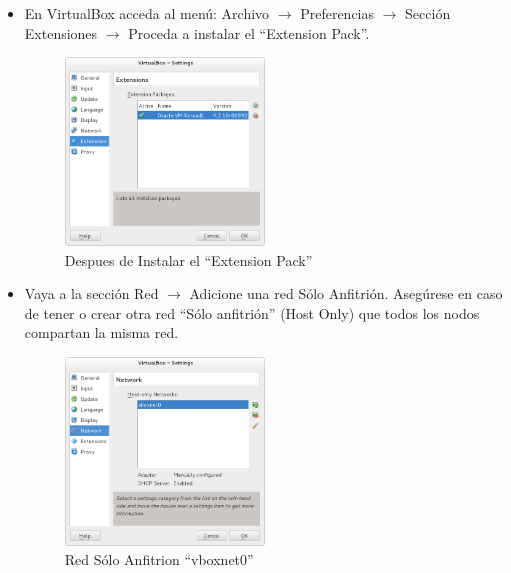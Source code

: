 \begin{enumerate}
\begin{itemize}


	\item En VirtualBox acceda al menú: Archivo $\rightarrow$ Preferencias $\rightarrow$ Sección Extensiones $\rightarrow$ Proceda a instalar el ``Extension Pack''. 
	
	\begin{figure}[H]
		\centering
		\includegraphics[width=0.5\textwidth]{aux/conextensionpack}
		\caption{Despues de Instalar el ``Extension Pack''}
	\end{figure}
	

	\item Vaya a la sección Red $\rightarrow$ Adicione una red Sólo Anfitrión. Asegúrese en caso de tener o crear otra red ``Sólo anfitrión'' (Host Only) que todos los nodos compartan la misma red.


	
	\begin{figure}[H]
		\centering
		\includegraphics[width=0.5\textwidth]{aux/hostonly}
		\caption{Red Sólo Anfitrion ``vboxnet0''}
	\end{figure}
	
	


\end{itemize}
\end{enumerate}
